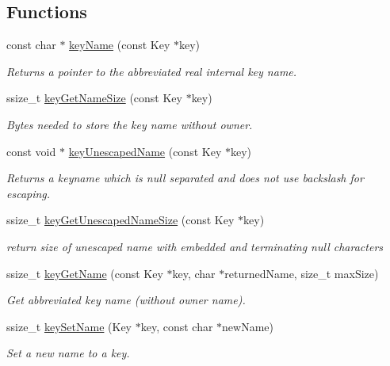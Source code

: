 \subsection*{Functions}
\begin{DoxyCompactItemize}
\item 
const char $\ast$ \hyperlink{group__keyname_ga8e805c726a60da921d3736cda7813513}{key\+Name} (const Key $\ast$key)
\begin{DoxyCompactList}\small\item\em Returns a pointer to the abbreviated real internal {\ttfamily key} name. \end{DoxyCompactList}\item 
ssize\+\_\+t \hyperlink{group__keyname_gabdbcfa51ed8a387e47ead207affa2d2e}{key\+Get\+Name\+Size} (const Key $\ast$key)
\begin{DoxyCompactList}\small\item\em Bytes needed to store the key name without owner. \end{DoxyCompactList}\item 
const void $\ast$ \hyperlink{group__keyname_ga6fe6af4c27b35d911a533f4ae4d698bb}{key\+Unescaped\+Name} (const Key $\ast$key)
\begin{DoxyCompactList}\small\item\em Returns a keyname which is null separated and does not use backslash for escaping. \end{DoxyCompactList}\item 
ssize\+\_\+t \hyperlink{group__keyname_ga5e7eff0c77678420199d0d2e8729152b}{key\+Get\+Unescaped\+Name\+Size} (const Key $\ast$key)
\begin{DoxyCompactList}\small\item\em return size of unescaped name with embedded and terminating null characters \end{DoxyCompactList}\item 
ssize\+\_\+t \hyperlink{group__keyname_gab29a850168d9b31c9529e90cf9ab68be}{key\+Get\+Name} (const Key $\ast$key, char $\ast$returned\+Name, size\+\_\+t max\+Size)
\begin{DoxyCompactList}\small\item\em Get abbreviated key name (without owner name). \end{DoxyCompactList}\item 
ssize\+\_\+t \hyperlink{group__keyname_ga7699091610e7f3f43d2949514a4b35d9}{key\+Set\+Name} (Key $\ast$key, const char $\ast$new\+Name)
\begin{DoxyCompactList}\small\item\em Set a new name to a key. \end{DoxyCompactList}\item 

\end{DoxyCompactItemize}
